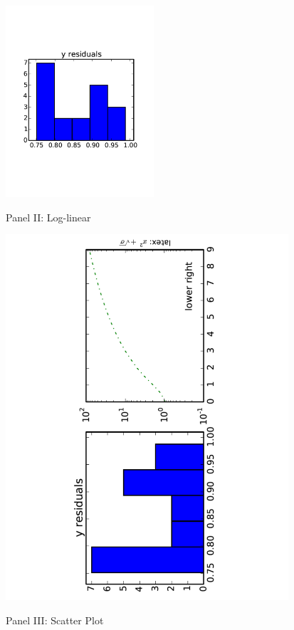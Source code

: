 \documentclass[10pt, t]{beamer}
\begin{document}
\begin{frame}[label=sec-3-18]{\quad}
\begin{center}
\includegraphics[width=5.5cm]{./figures/plot_histogramII.pdf}
\end{center}
\end{frame}
\begin{frame}[label=sec-3-19]{Panel II: Log-linear}
\end{frame}
\begin{frame}[label=sec-3-20]{\quad}
\begin{center}
\includegraphics[angle=-90,width=10.5cm]{./figures/plot_log.pdf}
\end{center}
\end{frame}
\begin{frame}[label=sec-3-21]{Panel III: Scatter Plot}
\end{frame}
\end{document}
